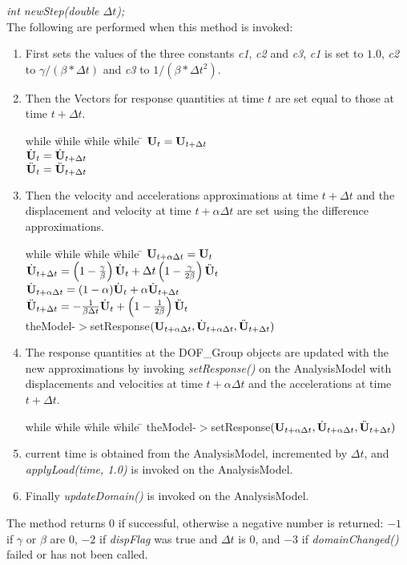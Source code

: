 {\em int newStep(double $\Delta t$);}\\
The following are performed when this method is invoked:
\begin{enumerate}
\item First sets the values of the three constants {\em c1}, {\em c2}
and {\em c3}, {\em c1} is set to $1.0$, {\em c2} to $
\gamma / (\beta * \Delta t)$ and {\em c3} to $1/ (\beta * \Delta t^2)$.
\item Then the Vectors for response quantities at time $t$ are set
equal to those at time $t + \Delta t$.
\begin{tabbing}
while \= while \= while \= while \= \kill
\>\> $ {\bf U}_t = {\bf U}_{t + \Delta t}$ \\
\>\> $ \dot{\bf U}_t = \dot{\bf U}_{t + \Delta t} $ \\
\>\> $ \ddot{\bf U}_t = \ddot{\bf U}_{t + \Delta t} $ 
\end{tabbing}
\item Then the velocity and accelerations approximations at time $t +
\Delta t$ and the displacement and velocity at time $t + \alpha \Delta t$
are set using the difference approximations.
\begin{tabbing}
while \= while \= while \= while \= \kill
\>\> $ {\bf U}_{t + \alpha \Delta t} = {\bf U}_t$ \\
\>\> $ \dot {{\bf U}}_{t + \Delta t} = 
 \left( 1 - \frac{\gamma}{\beta}\right) \dot {{\bf U}}_t + \Delta t \left(1
- \frac{\gamma}{2 \beta}\right) \ddot {{\bf U}}_t $ \\
\>\> $ \dot{\bf U}_{t + \alpha \Delta t} = (1 - \alpha) \dot{\bf U}_t + \alpha \dot{\bf U}_{t +
\Delta t}$ \\
\>\> $ \ddot {{\bf U}}_{t + \Delta t} = 
 - \frac{1}{\beta \Delta t} \dot {{\bf U}}_t + \left( 1 - \frac{1}{2
\beta} \right) \ddot {{\bf U}}_t  $ \\
\>\> theModel-$>$setResponse$({\bf U}_{t + \alpha \Delta t}, \dot{\bf U}_{t+\alpha
\Delta t}, \ddot{\bf U}_{t+\Delta t})$ 
\end{tabbing}
\item The response quantities at the DOF\_Group objects are updated
with the new approximations by invoking {\em setResponse()} on the
AnalysisModel with displacements and velocities at time $t + \alpha
\Delta t$ and the accelerations at time $t + \Delta t$.
\begin{tabbing}
while \= while \= while \= while \= \kill
\>\> theModel-$>$setResponse$({\bf U}_{t + \alpha \Delta t}, \dot{\bf U}_{t+\alpha
\Delta t}, \ddot{\bf U}_{t+\Delta t})$ 
\end{tabbing}
\item current time is obtained from the AnalysisModel, incremented by
$\Delta t$, and {\em applyLoad(time, 1.0)} is invoked on the
AnalysisModel. 
\item Finally {\em updateDomain()} is invoked on the AnalysisModel.
\end{enumerate}
The method returns $0$ if successful, otherwise a negative number is
returned: $-1$ if $\gamma$ or $\beta$ are $0$, $-2$ if {\em dispFlag}
was true and $\Delta t$ is $0$, and $-3$ if {\em domainChanged()}
failed or has not been called. \\



